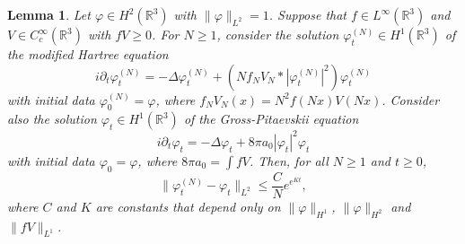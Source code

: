 \documentclass[11pt,a4paper,DIV11]{scrartcl}	%
\newtheorem{lem}[thm]{Lemma}
\newcommand{\R}{\mathds{R}}
\begin{document}
\begin{lem} \label{lem:phitN2phit}
  Let $\varphi \in H^2(\R^3)$ with $\| \varphi \|_{L^2} = 1$. Suppose that
  $f \in L^\infty(\R^3)$ and $V \in C_c^\infty(\R^3)$ with $fV \ge 0$. For $N \ge
  1$, consider the solution $\varphi_t^{(N)} \in H^1(\R^3)$ of the modified
  Hartree equation
  \[
    i \partial_t \varphi_t^{(N)} = - \Delta \varphi_t^{(N)} + (N f_N V_N *
    |\varphi_t^{(N)}|^2) \varphi_t^{(N)}
  \]
  with initial data $\varphi^{(N)}_0 = \varphi$, where $f_N V_N(x) = N^2
  f(Nx)V(Nx)$. Consider also the solution $\varphi_t \in H^1(\R^3)$ of the
  Gross-Pitaevskii equation
  \[
    i \partial_t \varphi_t = - \Delta \varphi_t + 8 \pi a_0 |\varphi_t|^2
    \varphi_t
  \]
  with initial data $\varphi_0 = \varphi$, where $8 \pi a_0 = \int f V$.
  Then, for all $N \ge 1$ and $t \ge 0$,
  \[
    \| \varphi_t^{(N)} - \varphi_t \|_{L^2} \le \frac{C}{N} e^{e^{K t}},
  \]
  where $C$ and $K$ are constants that depend only on $\| \varphi \|_{H^1}$,
  $\| \varphi \|_{H^2}$ and $\| fV \|_{L^1}$.
\end{lem}
\end{document}
